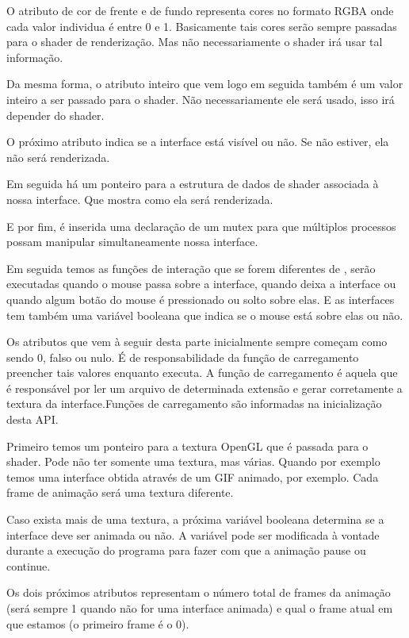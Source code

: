 O atributo de cor de frente e de fundo representa cores no formato
RGBA onde cada valor individua é entre 0 e 1. Basicamente tais cores
serão sempre passadas para o shader de renderização. Mas não
necessariamente o shader irá usar tal informação.

Da mesma forma, o atributo inteiro que vem logo em seguida também é um
valor inteiro a ser passado para o shader. Não necessariamente ele
será usado, isso irá depender do shader.

O próximo atributo indica se a interface está visível ou não. Se não
estiver, ela não será renderizada.

Em seguida há um ponteiro para a estrutura de dados de shader
associada à nossa interface. Que mostra como ela será renderizada.

E por fim, é inserida uma declaração de um mutex para que múltiplos
processos possam manipular simultaneamente nossa interface.

Em seguida temos as funções de interação que se forem diferentes
de , serão executadas quando o mouse passa sobre a
interface, quando deixa a interface ou quando algum botão do mouse é
pressionado ou solto sobre elas. E as interfaces tem também uma
variável booleana que indica se o mouse está sobre elas ou não.

Os atributos que vem à seguir desta parte inicialmente sempre começam
como sendo 0, falso ou nulo. É de responsabilidade da função de
carregamento preencher tais valores enquanto executa. A função de
carregamento é aquela que é responsável por ler um arquivo de
determinada extensão e gerar corretamente a textura da
interface.Funções de carregamento são informadas na inicialização
desta API.

Primeiro temos um ponteiro para a textura OpenGL que é passada para o
shader. Pode não ter somente uma textura, mas várias. Quando por
exemplo temos uma interface obtida através de um GIF animado, por
exemplo. Cada frame de animação será uma textura diferente.

Caso exista mais de uma textura, a próxima variável booleana determina
se a interface deve ser animada ou não. A variável pode ser modificada
à vontade durante a execução do programa para fazer com que a animação
pause ou continue.

Os dois próximos atributos representam o número total de frames da
animação (será sempre 1 quando não for uma interface animada) e qual o
frame atual em que estamos (o primeiro frame é o 0).

